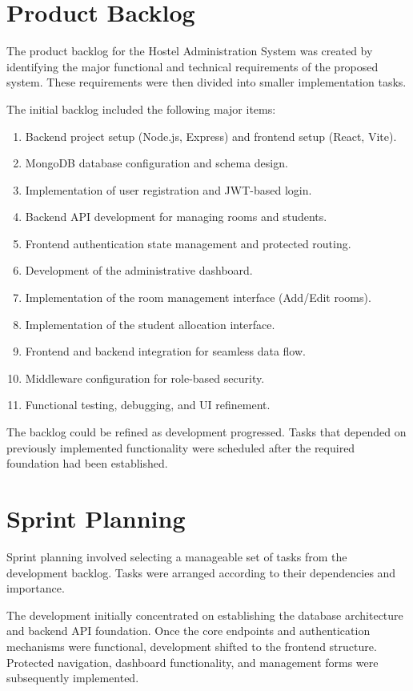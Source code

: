 \section{Product Backlog}

The product backlog for the Hostel Administration System was created by identifying the major functional and technical requirements of the proposed system. These requirements were then divided into smaller implementation tasks.

The initial backlog included the following major items:

\begin{enumerate}
    \item Backend project setup (Node.js, Express) and frontend setup (React, Vite).
    \item MongoDB database configuration and schema design.
    \item Implementation of user registration and JWT-based login.
    \item Backend API development for managing rooms and students.
    \item Frontend authentication state management and protected routing.
    \item Development of the administrative dashboard.
    \item Implementation of the room management interface (Add/Edit rooms).
    \item Implementation of the student allocation interface.
    \item Frontend and backend integration for seamless data flow.
    \item Middleware configuration for role-based security.
    \item Functional testing, debugging, and UI refinement.
\end{enumerate}

The backlog could be refined as development progressed. Tasks that depended on previously implemented functionality were scheduled after the required foundation had been established.

\section{Sprint Planning}

Sprint planning involved selecting a manageable set of tasks from the development backlog. Tasks were arranged according to their dependencies and importance.

The development initially concentrated on establishing the database architecture and backend API foundation. Once the core endpoints and authentication mechanisms were functional, development shifted to the frontend structure. Protected navigation, dashboard functionality, and management forms were subsequently implemented.

